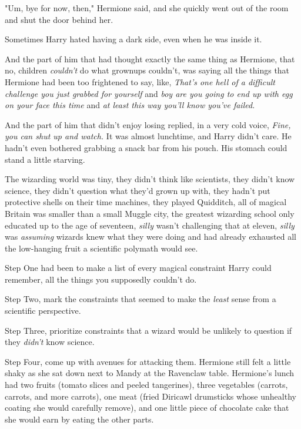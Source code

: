 "Um, bye for now, then," Hermione said, and she quickly went out of the room 
and shut the door behind her.

Sometimes Harry hated having a dark side, even when he was inside it.

And the part of him that had thought exactly the same thing as Hermione, that 
no, children \emph{couldn't} do what grownups couldn't, was saying all the 
things that Hermione had been too frightened to say, like, \emph{That's one 
hell of a difficult challenge you just grabbed for yourself} and \emph{boy are 
you going to end up with egg on your face this time} and \emph{at least this 
way you'll know you've failed.}

And the part of him that didn't enjoy losing replied, in a very cold voice, 
\emph{Fine, you can shut up and watch.}
\sbreak
It was almost lunchtime, and Harry didn't care. He hadn't even bothered 
grabbing a snack bar from his pouch. His stomach could stand a little starving.

The wizarding world was tiny, they didn't think like scientists, they didn't 
know science, they didn't question what they'd grown up with, they hadn't put 
protective shells on their time machines, they played Quidditch, all of magical 
Britain was smaller than a small Muggle city, the greatest wizarding school 
only educated up to the age of seventeen, \emph{silly} wasn't challenging that 
at eleven, \emph{silly} was \emph{assuming} wizards knew what they were doing 
and had already exhausted all the low-hanging fruit a scientific polymath would 
see.

Step One had been to make a list of every magical constraint Harry could 
remember, all the things you supposedly couldn't do.

Step Two, mark the constraints that seemed to make the \emph{least} sense from 
a scientific perspective.

Step Three, prioritize constraints that a wizard would be unlikely to question 
if they \emph{didn't} know science.

Step Four, come up with avenues for attacking them.
\sbreak
Hermione still felt a little shaky as she sat down next to Mandy at the 
Ravenclaw table. Hermione's lunch had two fruits (tomato slices and peeled 
tangerines), three vegetables (carrots, carrots, and more carrots), one meat 
(fried Diricawl drumsticks whose unhealthy coating she would carefully remove), 
and one little piece of chocolate cake that she would earn by eating the other 
parts.

